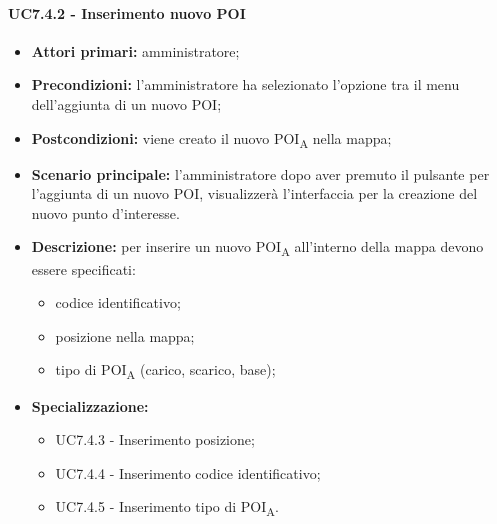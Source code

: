 \paragraph{UC7.4.2 - Inserimento nuovo POI}

\begin{itemize}
	\item 	\textbf{Attori primari:} amministratore;
	\item 	\textbf{Precondizioni:} l’amministratore ha selezionato l’opzione tra il menu dell’aggiunta di un nuovo POI;
	\item 	\textbf{Postcondizioni:} viene creato il nuovo \acrshort{POI}\textsubscript{A} nella mappa;
	\item 	\textbf{Scenario principale:} l’amministratore dopo aver premuto il pulsante per l’aggiunta di un nuovo POI, visualizzerà l’interfaccia per la creazione del nuovo punto d’interesse. 
	\item 	\textbf{Descrizione:} per inserire un nuovo \acrshort{POI}\textsubscript{A} all’interno della mappa devono essere specificati:
	\begin{itemize}
		\item codice identificativo;
		\item posizione nella mappa;
		\item tipo di \acrshort{POI}\textsubscript{A} (carico, scarico, base);
	\end{itemize}
	\item 	\textbf{Specializzazione:}
	\begin{itemize}
		\item UC7.4.3 - Inserimento posizione;
		\item UC7.4.4 - Inserimento codice identificativo;
		\item UC7.4.5 - Inserimento tipo di \acrshort{POI}\textsubscript{A}.
	\end{itemize}
\end{itemize}

